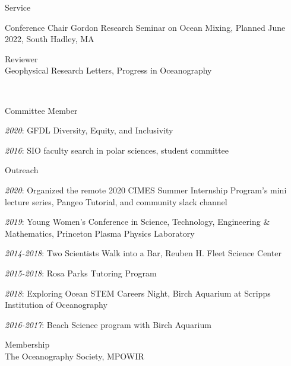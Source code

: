 \documentclass{resume} %
\begin{document}
\begin{rSection}{Service}
\begin{rSubsection}{Conference Chair}
Gordon Research Seminar on Ocean Mixing, Planned June 2022, South Hadley, MA
\end{rSubsection}
\begin{rSubsectionW}{Reviewer}
\\Geophysical Research Letters, Progress in Oceanography
\end{rSubsectionW}
\\
\begin{rSubsection}{Committee Member}
\item {\em 2020}: GFDL Diversity, Equity, and Inclusivity
\item {\em 2016}: SIO faculty search in polar sciences, student committee
\end{rSubsection}
\begin{rSubsection}{Outreach}
\item {\em 2020}: Organized the remote 2020 CIMES Summer Internship Program's mini lecture series, Pangeo Tutorial, and community slack channel
\item {\em 2019}: Young Women's Conference in Science, Technology, Engineering \& Mathematics, Princeton Plasma Physics Laboratory
\item {\em 2014-2018}: Two Scientists Walk into a Bar, Reuben H. Fleet Science Center
\item {\em 2015-2018}: Rosa Parks Tutoring Program
\item {\em 2018}: Exploring Ocean STEM Careers Night, Birch Aquarium at Scripps Institution of Oceanography
\item {\em 2016-2017}: Beach Science program with Birch Aquarium
\end{rSubsection}
\begin{rSubsectionW}{Membership}
\\The Oceanography Society, MPOWIR
\end{rSubsectionW}
\end{rSection}
\end{document}
